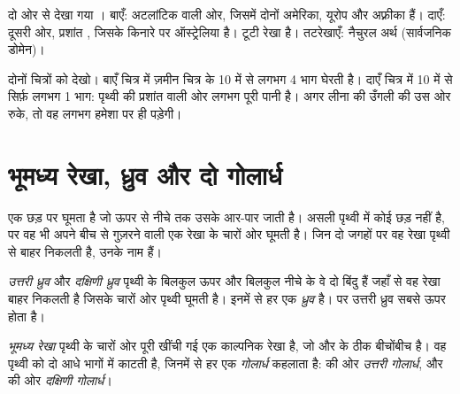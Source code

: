 \begin{omfigure}
{\small दो ओर से देखा गया । बाएँ: अटलांटिक  वाली ओर, जिसमें दोनों
अमेरिका, यूरोप और अफ़्रीका हैं। दाएँ: दूसरी ओर, प्रशांत , जिसके किनारे
पर ऑस्ट्रेलिया है। टूटी रेखा  है। तटरेखाएँ: नैचुरल अर्थ
(सार्वजनिक डोमेन)।}
\label{fig:g3:continents-and-oceans:globes}
\end{omfigure}

\begin{remark}[दो बहुत अलग आधे भाग]\label{rem:g3:continents-and-oceans:halves}
दोनों चित्रों को देखो। बाएँ चित्र में ज़मीन चित्र के 10 में से लगभग 4 भाग
घेरती है। दाएँ चित्र में 10 में से सिर्फ़ लगभग 1 भाग: पृथ्वी की प्रशांत वाली
ओर लगभग पूरी पानी है। अगर लीना की उँगली  की उस ओर रुके, तो वह लगभग
हमेशा  पर ही पड़ेगी।
\end{remark}

\section{भूमध्य रेखा, ध्रुव और दो गोलार्ध}

 एक छड़ पर घूमता है जो ऊपर से नीचे तक उसके आर-पार जाती है। असली पृथ्वी
में कोई छड़ नहीं है, पर वह भी अपने बीच से गुज़रने वाली एक रेखा के चारों ओर
घूमती है। जिन दो जगहों पर वह रेखा पृथ्वी से बाहर निकलती है, उनके नाम हैं।

\begin{definition}[ध्रुव]\label{def:g3:continents-and-oceans:poles}
\emph{उत्तरी ध्रुव} और \emph{दक्षिणी
ध्रुव} पृथ्वी के बिलकुल ऊपर और बिलकुल नीचे के वे दो
बिंदु हैं जहाँ से वह रेखा बाहर निकलती है जिसके चारों ओर पृथ्वी घूमती है।
इनमें से हर एक \emph{ध्रुव} है।  पर उत्तरी ध्रुव सबसे ऊपर
होता है।
\end{definition}

\begin{definition}[भूमध्य रेखा और गोलार्ध]\label{def:g3:continents-and-oceans:equator}
\emph{भूमध्य रेखा} पृथ्वी के चारों ओर पूरी खींची गई एक
काल्पनिक रेखा है, जो  और  के ठीक बीचोंबीच है। वह
पृथ्वी को दो आधे भागों में काटती है, जिनमें से हर एक
\emph{गोलार्ध} कहलाता है:  की ओर
\emph{उत्तरी गोलार्ध}, और  की ओर
\emph{दक्षिणी गोलार्ध}।
\end{definition}


